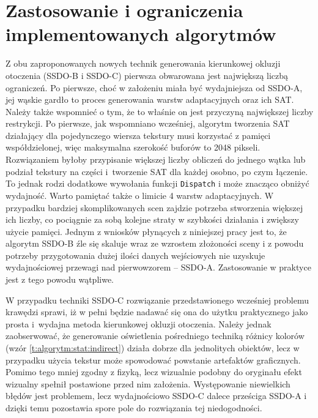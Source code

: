 	\section{Zastosowanie i ograniczenia implementowanych algorytmów}
	\label{t:wnioski:zastosowanie}
	
	
	
	Z obu zaproponowanych nowych technik generowania kierunkowej okluzji otoczenia (SSDO-B i SSDO-C) pierwsza obwarowana jest największą liczbą ograniczeń. Po pierwsze, choć w założeniu miała być wydajniejsza od SSDO-A, jej wąskie gardło to proces generowania warstw adaptacyjnych oraz ich SAT. Należy także wspomnieć o tym, że to właśnie on jest przyczyną największej liczby restrykcji. Po pierwsze, jak wspomniano wcześniej, algorytm tworzenia SAT działający dla pojedynczego wiersza tekstury musi korzystać z pamięci współdzielonej, więc maksymalna szerokość buforów to 2048 pikseli. Rozwiązaniem byłoby przypisanie większej liczby obliczeń do jednego wątka lub podział tekstury na części i~tworzenie SAT dla każdej osobno, po czym łączenie. To jednak rodzi dodatkowe wywołania funkcji \texttt{Dispatch} i może znacząco obniżyć wydajność. Warto pamiętać także o limicie 4 warstw adaptacyjnych. W przypadku bardziej skomplikowanych scen zajdzie potrzeba stworzenia większej ich liczby, co pociągnie za sobą kolejne straty w szybkości działania i zwiększy użycie pamięci. Jednym z wniosków płynących z niniejszej pracy jest to, że algorytm SSDO-B źle się skaluje wraz ze wzrostem złożoności sceny i z powodu potrzeby przygotowania dużej ilości danych wejściowych nie uzyskuje wydajnościowej przewagi nad pierwowzorem -- SSDO-A. Zastosowanie w praktyce jest z tego powodu wątpliwe.
	
	W przypadku techniki SSDO-C rozwiązanie przedstawionego wcześniej problemu krawędzi sprawi, iż w pełni będzie nadawać się ona do użytku praktycznego jako prosta i~wydajna metoda kierunkowej okluzji otoczenia. Należy jednak zaobserwować, że generowanie oświetlenia pośredniego techniką różnicy kolorów (wzór \ref{t:algorytm:stat:indirect}) działa dobrze dla jednolitych obiektów, lecz w przypadku użycia tekstur może spowodować powstanie artefaktów graficznych. Pomimo tego mniej zgodny z fizyką, lecz wizualnie podobny do oryginału efekt wizualny spełnił postawione przed nim założenia. Występowanie niewielkich błędów jest problemem, lecz wydajnościowo SSDO-C dalece prześciga SSDO-A i dzięki temu pozostawia spore pole do rozwiązania tej niedogodności.
	

